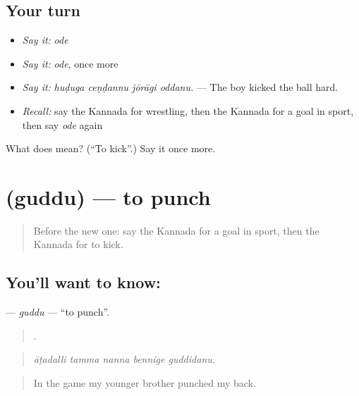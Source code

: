 \subsection*{Your turn}
\begin{itemize}
\raggedright
  \item \emph{Say it:} \emph{ode}
  \item \emph{Say it:} \emph{ode}, once more
  \item \emph{Say it:} \emph{huḍuga ceṇḍannu jōrāgi oddanu.} — The boy kicked the ball hard.
  \item \emph{Recall:} say the Kannada for wrestling, then the Kannada for a goal in sport, then say \emph{ode} again
\end{itemize}

\begin{tcolorbox}[breakable,colback=teal!4,colframe=teal!35!black,title={Before you move on}]
What does  mean? (\textquotedblleft{}To kick\textquotedblright{}.) Say it once more.
\end{tcolorbox}
\section[\texorpdfstring{\kn{ಗುದ್ದು} (guddu)}{ಗುದ್ದು (guddu)}]{ (guddu) — to punch}

\label{lesson:KA-C540-guddu}



\begin{quote}
Before the new one: say the Kannada for a goal in sport, then the Kannada for to kick.
\end{quote}

\subsection*{You'll want to know: }
\textbf{} — \emph{guddu} — \textquotedblleft{}to punch\textquotedblright{}.

\begin{quote}
    .
\end{quote}

\begin{quote}
\emph{āṭadalli tamma nanna bennige guddidanu.}
\end{quote}

\begin{quote}
In the game my younger brother punched my back.
\end{quote}

